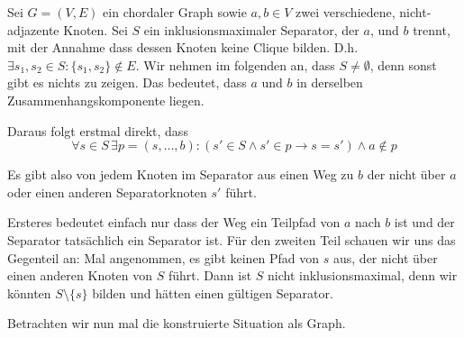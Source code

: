 
\subexercise
\label{sec:sep-clique}

Sei $G = (V,E)$ ein chordaler Graph sowie $a,b \in V$ zwei verschiedene, nicht-adjazente Knoten. Sei $S$ ein inklusionsmaximaler Separator, der $a$, und $b$ trennt, mit der Annahme dass dessen Knoten keine Clique bilden. D.h.
$\exists s_1, s_2 \in S \colon \{s_1, s_2\} \notin E$.
Wir nehmen im folgenden an, dass $S \neq \emptyset$, denn sonst gibt es nichts zu zeigen. Das bedeutet, dass $a$ und $b$ in derselben Zusammenhangskomponente liegen.

Daraus folgt erstmal direkt, dass $$\forall s \in S \, \exists p = (s, \dots, b) \colon (s' \in S \wedge s' \in p \rightarrow s = s') \wedge a \notin p$$

Es gibt also von jedem Knoten im Separator aus einen Weg zu $b$ der nicht über $a$ oder einen anderen Separatorknoten $s'$ führt.

Ersteres bedeutet einfach nur dass der Weg ein Teilpfad von $a$ nach $b$ ist und der Separator tatsächlich ein Separator ist. Für den zweiten Teil schauen wir uns das Gegenteil an:
Mal angenommen, es gibt keinen Pfad von $s$ aus, der nicht über einen anderen Knoten von $S$ führt. Dann ist $S$ nicht inklusionsmaximal, denn wir könnten $S \setminus \{s\}$ bilden und hätten einen gültigen Separator.

Betrachten wir nun mal die konstruierte Situation als Graph.

